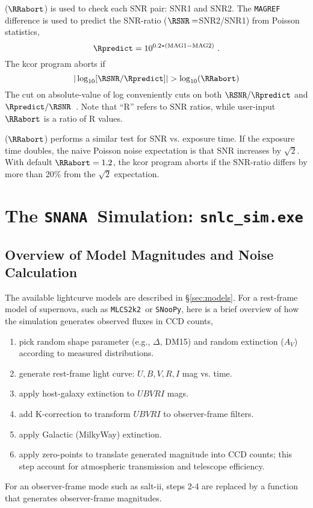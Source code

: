 \documentclass[12pt]{article}
\newcommand{\simexe}{{\tt snlc\_sim.exe}}
\newcommand{\mlcs}{{\tt MLCS2k2}}
\newcommand{\SALTII}{{\sc salt-ii}}
\newcommand{\snoopy}{{\tt SNooPy}}
\newcommand{\snana}{{\tt SNANA}}
\newcommand{\eff}{efficiency}
\begin{document}
{ 
($\RRabort$) is used to check each SNR pair: SNR1 and SNR2. 
The {\tt MAGREF} difference is used to predict the
SNR-ratio ($\RSNR=$SNR2/SNR1) from Poisson statistics,
%
\begin{equation}
  \Rpredict = 10^{0.2*({\rm MAG1}-{\rm MAG2})} ~.
\end{equation}
%
The kcor program aborts if
\begin{equation}
  \vert \log_{10}[\RSNR/\Rpredict] \vert  > \log_{10}(\RRabort)
\end{equation}
%
The cut on absolute-value of log conveniently cuts on both
$\RSNR/\Rpredict$ and $\Rpredict/\RSNR$~.
Note that ``R'' refers to SNR ratios, while user-input 
$\RRabort$ is a ratio of R values.

\bigskip
{}
($\RRabort$)
performs a similar test for SNR vs. exposure time. 
If the exposure time doubles, the naive Poisson noise expectation
is that SNR increases by $\sqrt{2}$.
With default $\RRabort=1.2$, the kcor program aborts if
the SNR-ratio differs by more than 20\% from the
$\sqrt{2}$ expectation.

   \clearpage
   \section{The \snana\ Simulation:  \simexe}
   \label{sec:snlc_sim}

   \subsection{Overview of Model Magnitudes and Noise Calculation }
   \label{subsec:overview}

The available lightcurve models are described in \S\ref{sec:models}.
For a rest-frame model of supernova, such as \mlcs\ or \snoopy,
here is a brief overview of how the simulation generates
observed fluxes in CCD counts,
%
\begin{enumerate}
  \item	pick random shape parameter (e.g., $\Delta$, DM15) 
        and random extinction ($A_V$) according to measured 
        distributions.
  \item	generate rest-frame light curve: $U,B,V,R,I$ mag vs. time.
  \item	apply host-galaxy extinction to $UBVRI$ mags.
  \item	add K-correction to transform $UBVRI$  to observer-frame filters.
  \item	apply Galactic (MilkyWay) extinction.
  \item	apply zero-points to translate generated magnitude into
        CCD counts; this step account for atmospheric transmission
        and telescope \eff.
\end{enumerate}
%
For an observer-frame mode such as \SALTII,
steps 2-4 are replaced by a function that generates
observer-frame magnitudes.

}
\end{document}
